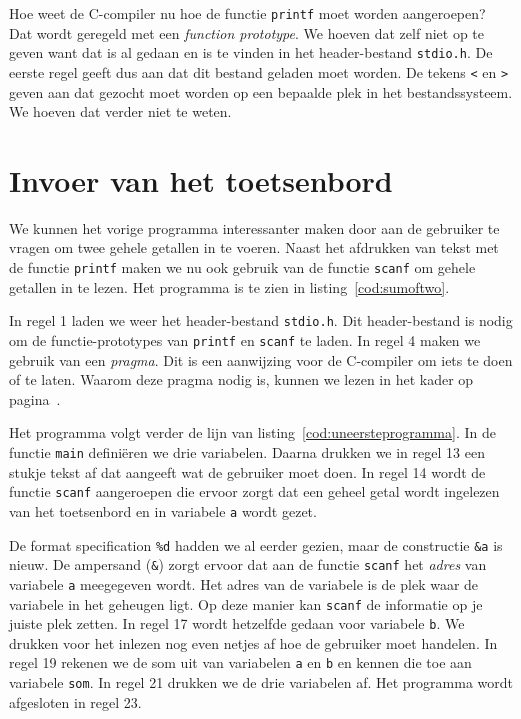 Hoe weet de C-compiler nu hoe de functie \texttt{printf} moet worden aangeroepen? Dat wordt geregeld met een \textsl{function prototype}. We hoeven dat zelf niet op te geven want dat is al gedaan en is te vinden in het header-bestand \texttt{stdio.h}. De eerste regel geeft dus aan dat dit bestand geladen moet worden. De tekens \texttt{<} en \texttt{>} geven aan dat gezocht moet worden op een bepaalde plek in het bestandssysteem. We hoeven dat verder niet te weten.


\section{Invoer van het toetsenbord}
We kunnen het vorige programma interessanter maken door aan de gebruiker te vragen om twee gehele getallen in te voeren. Naast het afdrukken van tekst met de functie \texttt{printf} maken we nu ook gebruik van de functie \texttt{scanf} om gehele getallen in te lezen. Het programma is te zien in listing~\ref{cod:sumoftwo}.


In regel 1 laden we weer het header-bestand \texttt{stdio.h}. Dit header-bestand is nodig om de functie-prototypes van \texttt{printf} en \texttt{scanf} te laden. In regel 4 maken we gebruik van een \textsl{pragma}. Dit is een aanwijzing voor de C-compiler om iets te doen of te laten. Waarom deze pragma nodig is, kunnen we lezen in het kader op pagina~\pageref{fig:unopmerkingscanf}.

Het programma volgt verder de lijn van listing~\ref{cod:uneersteprogramma}. In de functie \texttt{main} definiëren we drie variabelen. Daarna drukken we in regel 13 een stukje tekst af dat aangeeft wat de gebruiker moet doen. In regel 14 wordt de functie \texttt{scanf} aangeroepen die ervoor zorgt dat een geheel getal wordt ingelezen van het toetsenbord en in variabele \texttt{a} wordt gezet.

De format specification \texttt{\%d} hadden we al eerder gezien, maar de constructie \texttt{\&a} is nieuw. De ampersand (\texttt{\&}) zorgt ervoor dat aan de functie \texttt{scanf} het \textsl{adres} van variabele \texttt{a} meegegeven wordt. Het adres van de variabele is de plek waar de variabele in het geheugen ligt. Op deze manier kan \texttt{scanf} de informatie op je juiste plek zetten. In regel 17 wordt hetzelfde gedaan voor variabele \texttt{b}. We drukken voor het inlezen nog even netjes af hoe de gebruiker moet handelen. In regel 19 rekenen we de som uit van variabelen \texttt{a} en \texttt{b} en kennen die toe aan variabele \texttt{som}. In regel 21 drukken we de drie variabelen af. Het programma wordt afgesloten in regel 23.

